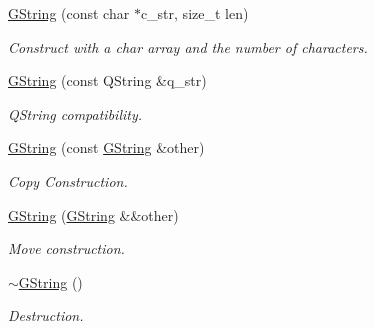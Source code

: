\begin{Indent}
\begin{DoxyCompactItemize}
\mbox{\hyperlink{classrev_1_1_g_string_ac4f1ce67ddc1caec8d5cd28bb4eb4164}{G\+String}} (const char $\ast$c\+\_\+str, size\+\_\+t len)
\begin{DoxyCompactList}\small\item\em Construct with a char array and the number of characters. \end{DoxyCompactList}\item 
\mbox{\label{classrev_1_1_g_string_a94355b03a7f7bf7591e505b0ce1ab991}} 
\mbox{\hyperlink{classrev_1_1_g_string_a94355b03a7f7bf7591e505b0ce1ab991}{G\+String}} (const Q\+String \&q\+\_\+str)
\begin{DoxyCompactList}\small\item\em Q\+String compatibility. \end{DoxyCompactList}\item 
\mbox{\label{classrev_1_1_g_string_a21ff465971ceeb5d096453327a44c077}} 
\mbox{\hyperlink{classrev_1_1_g_string_a21ff465971ceeb5d096453327a44c077}{G\+String}} (const \mbox{\hyperlink{classrev_1_1_g_string}{G\+String}} \&other)
\begin{DoxyCompactList}\small\item\em Copy Construction. \end{DoxyCompactList}\item 
\mbox{\label{classrev_1_1_g_string_aa56f4c7c6f1d8f5723d8a69109712811}} 
\mbox{\hyperlink{classrev_1_1_g_string_aa56f4c7c6f1d8f5723d8a69109712811}{G\+String}} (\mbox{\hyperlink{classrev_1_1_g_string}{G\+String}} \&\&other)
\begin{DoxyCompactList}\small\item\em Move construction. \end{DoxyCompactList}\item 
\mbox{\label{classrev_1_1_g_string_adbd6f63f177908a0b15a98c46cdf2b93}} 
\mbox{\hyperlink{classrev_1_1_g_string_adbd6f63f177908a0b15a98c46cdf2b93}{$\sim$\+G\+String}} ()
\begin{DoxyCompactList}\small\item\em Destruction. \end{DoxyCompactList}\end{DoxyCompactItemize}
\end{Indent}
